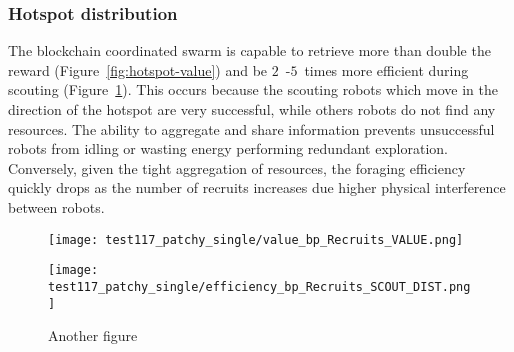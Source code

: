 \documentclass[runningheads]{llncs}
\begin{document}
\subsubsection{Hotspot distribution}

The blockchain coordinated swarm is capable to retrieve more than double the reward (Figure~\ref{fig:hotspot-value}) and be $2$~-$5$~times more efficient during scouting (Figure~\ref{fig:hotspot-eff-exp}). This occurs because the scouting robots which move in the direction of the hotspot are very successful, while others robots do not find any resources. The ability to aggregate and share information prevents unsuccessful robots from idling or wasting energy performing redundant exploration. Conversely, given the tight aggregation of resources, the foraging efficiency quickly drops as the number of recruits increases due higher physical interference between robots. %

\begin{figure}
\centering
\begin{minipage}{.495\textwidth}
  \centering
  \texttt{[image: test117\_patchy\_single/value\_bp\_Recruits\_VALUE.png]}
  \caption{}
  \label{fig:hotspot-value}
\end{minipage}
\begin{minipage}{.495\textwidth}
  \centering
  \texttt{[image: test117\_patchy\_single/efficiency\_bp\_Recruits\_SCOUT\_DIST.png]}
  \caption{Another figure}
  \label{fig:hotspot-eff-exp}
\end{minipage}
\end{figure}

\end{document}
